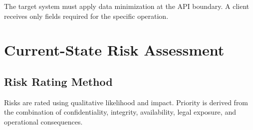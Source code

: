 \documentclass[11pt,a4paper,oneside]{report}
\begin{document}
The target system must apply data minimization at the API boundary. A client receives only fields required for the specific operation.

\chapter{Current-State Risk Assessment}

\section{Risk Rating Method}

Risks are rated using qualitative likelihood and impact. Priority is derived from the combination of confidentiality, integrity, availability, legal exposure, and operational consequences.
\end{document}
